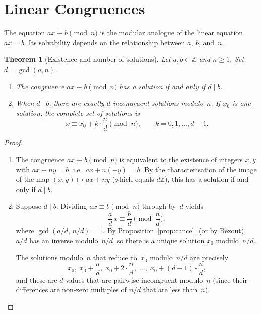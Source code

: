\documentclass[12pt,a4paper,openany]{book}
\theoremstyle{definition}
\theoremstyle{plain}
\newtheorem{theorem}[definition]{Theorem}
\theoremstyle{remark}
\newcommand{\Z}{\mathbb{Z}}
\begin{document}
\section{Linear Congruences}
\label{sec:linear-cong}

The equation $ax \equiv b \pmod{n}$ is the modular analogue of the
linear equation $ax = b$.  Its solvability depends on the relationship
between $a$, $b$, and~$n$.

\begin{theorem}[Existence and number of solutions]
\label{thm:linear-cong}
Let $a,b \in \Z$ and $n \ge 1$.  Set $d = \gcd(a,n)$.
\begin{enumerate}[label=(\roman*)]
  \item The congruence $ax \equiv b \pmod{n}$ has a solution if and only
        if $d \mid b$.
  \item When $d \mid b$, there are exactly $d$ incongruent solutions modulo~$n$.
        If $x_0$ is one solution, the complete set of solutions is
        \[
          x \equiv x_0 + k \cdot \frac{n}{d} \pmod{n}, \qquad k = 0, 1, \dots, d-1.
        \]
\end{enumerate}
\end{theorem}

\begin{proof}
\leavevmode
\begin{enumerate}[label=(\roman*)]
  \item The congruence $ax \equiv b \pmod{n}$ is equivalent to the
        existence of integers $x, y$ with $ax - ny = b$, i.e.\ $ax + n(-y) = b$.
        By the characterisation of the image of the map
        $(x,y) \mapsto ax + ny$ (which equals $d\Z$), this has a solution
        if and only if $d \mid b$.

  \item Suppose $d \mid b$.  Dividing $ax \equiv b \pmod{n}$ through by~$d$ yields
        \[
          \frac{a}{d}\, x \equiv \frac{b}{d} \pmod{\frac{n}{d}},
        \]
        where $\gcd(a/d,\, n/d) = 1$.  By Proposition~\ref{prop:cancel} (or by
        Bézout), $a/d$ has an inverse modulo~$n/d$, so there is a unique
        solution $x_0$ modulo~$n/d$.

        The solutions modulo~$n$ that reduce to~$x_0$ modulo~$n/d$ are
        precisely
        \[
          x_0,\; x_0 + \frac{n}{d},\; x_0 + 2\cdot\frac{n}{d},\;
          \dots,\; x_0 + (d-1)\cdot\frac{n}{d},
        \]
        and these are $d$ values that are pairwise incongruent modulo~$n$
        (since their differences are non-zero multiples of $n/d$ that are
        less than~$n$).
        \qedhere
\end{enumerate}
\end{proof}
\end{document}
